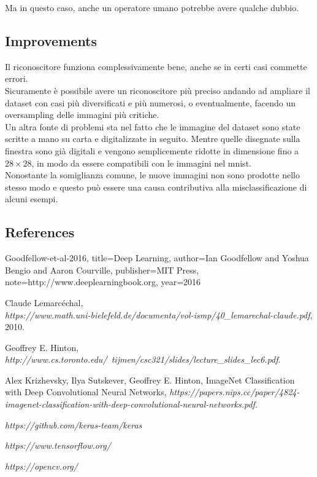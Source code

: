 \documentclass[12pt]{article}
\begin{document}
Ma in questo caso, anche un operatore umano potrebbe avere qualche dubbio.


\subsection{Improvements}

Il riconoscitore funziona complessivamente bene, anche se in certi casi
commette errori.\\

Sicuramente è possibile avere un riconoscitore più preciso andando
ad ampliare il dataset con casi più diversificati e più numerosi, 
o eventualmente, facendo un oversampling delle immagini più critiche.\\

Un altra fonte di problemi sta nel fatto che le immagine del dataset sono
state scritte a mano su carta e digitalizzate in seguito.
Mentre quelle disegnate sulla finestra sono già digitali e vengono
semplicemente ridotte in dimensione fino a $28\times28$, in modo da essere
compatibili con le immagini nel mnist.\\
Nonostante la somiglianza comune, le nuove immagini non sono prodotte
nello stesso modo e questo può essere una causa contributiva alla misclassificazione
di alcuni esempi.



\subsection{References}

\begin{thebibliography}{9}


    Goodfellow-et-al-2016,
    title={Deep Learning},
    author={Ian Goodfellow and Yoshua Bengio and Aaron Courville},
    publisher={MIT Press},
    note={http://www.deeplearningbook.org},
    year={2016}

  Claude Lemarcéchal,\\
  \textit{https://www.math.uni-bielefeld.de/documenta/vol-ismp/40\_lemarechal-claude.pdf},
  2010.

   Geoffrey E. Hinton,\\
  \textit{http://www.cs.toronto.edu/~tijmen/csc321/slides/lecture\_slides\_lec6.pdf}.

   Alex Krizhevsky, Ilya Sutskever, Geoffrey E. Hinton, 
   ImageNet Classification with Deep Convolutional Neural Networks,
  \textit{https://papers.nips.cc/paper/4824-imagenet-classification-with-deep-convolutional-neural-networks.pdf}.

   \textit{https://github.com/keras-team/keras}

   \textit{https://www.tensorflow.org/}

   \textit{https://opencv.org/}


\end{thebibliography}
\end{document}
